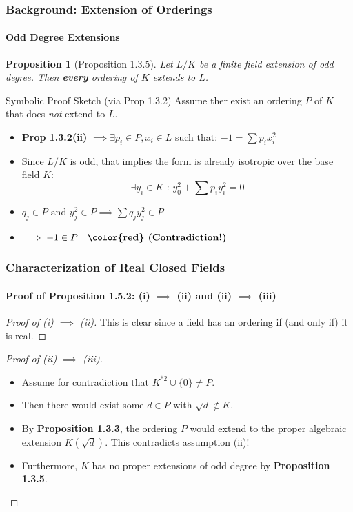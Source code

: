 \documentclass[11pt]{beamer}
\newtheorem{proposition}{Proposition}
\begin{document}
\begin{frame}
    \frametitle{Background: Extension of Orderings}
    \framesubtitle{Odd Degree Extensions}
    \vspace{-0.4em}
    \begin{proposition}[Proposition 1.3.5]
        Let $L/K$ be a finite field extension of odd degree. Then \textbf{every} ordering of $K$ extends to $L$.
    \end{proposition}

    \vspace{-0.6em}
    
    \begin{block}{Symbolic Proof Sketch (via Prop 1.3.2)}
        Assume ther exist an ordering $P$ of $K$ that does \emph{not} extend to $L$.
        \vspace{-0.2em}
        \begin{itemize}
            \setlength{\itemsep}{0.6em}
            \item \textbf{Prop 1.3.2(ii)} $\implies \exists p_i \in P, x_i \in L$ such that:
                  \( -1 = \sum p_i x_i^2 \)
            \item Since $L/K$ is odd, that implies the form is already isotropic over the base field $K$:
                  \[ \exists y_i \in K \text{ : } y_0^2 + \sum p_i y_i^2 = 0 \]
            \item $q_j \in P \text{ and } y_j^2 \in P \implies \sum q_j y_j^2 \in P$
            \item $\implies -1 \in P \quad \textbf{\color{red} (Contradiction!)}$
        \end{itemize}
    \end{block}
\end{frame}


\begin{frame}
    \frametitle{Characterization of Real Closed Fields}
    \framesubtitle{Proof of Proposition 1.5.2: (i) $\implies$ (ii) and (ii) $\implies$ (iii)}

    \begin{proof}[Proof of (i) $\implies$ (ii)]
        This is clear since a field has an ordering if (and only if) it is real.
    \end{proof}
    \vspace{0.4em}
    
    \begin{proof}[Proof of (ii) $\implies$ (iii)]
        \begin{itemize}
            \item Assume for contradiction that $K^{*2} \cup \{0\} \neq P$.
            \item Then there would exist some $d \in P$ with $\sqrt{d} \notin K$. 
            \item By \textbf{Proposition 1.3.3}, the ordering $P$ would extend to the proper algebraic extension $K(\sqrt{d})$. This contradicts assumption (ii)!
            \item Furthermore, $K$ has no proper extensions of odd degree by \textbf{Proposition 1.3.5}.
        \end{itemize}
    \end{proof}
\end{frame}
\end{document}
